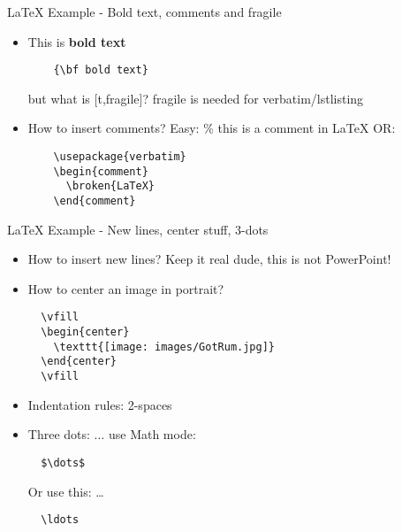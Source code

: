 
\begin{frame}[t,plain]
  \titlepage
\end{frame}

\begin{frame}[t,fragile]{LaTeX Example - Bold text, comments and fragile}
\begin{itemize}
  \item This is {\bf bold text}
  \begin{lstlisting}
    {\bf bold text}
  \end{lstlisting}
but what is [t,fragile]?
fragile is needed for verbatim/lstlisting
  \item How to insert comments?
  Easy: \% this is a comment in LaTeX
  OR:
  \begin{lstlisting}
    \usepackage{verbatim}
    \begin{comment}
      \broken{LaTeX}
    \end{comment}
  \end{lstlisting}
  \end{itemize}
\end{frame}

\begin{frame}[t,fragile]{LaTeX Example - New lines, center stuff, 3-dots}
\begin{itemize}
  \item How to insert new lines?
  Keep it real dude, this is not PowerPoint!
  \item How to center an image in portrait?
  \begin{lstlisting}
  \vfill
  \begin{center}
    \texttt{[image: images/GotRum.jpg]}
  \end{center}
  \vfill
  \end{lstlisting}
  \item Indentation rules: 2-spaces
  \item Three dots: $\dots$
  use Math mode:
  \begin{lstlisting}
  $\dots$
  \end{lstlisting}
  Or use this: \ldots
  \begin{lstlisting}
  \ldots
  \end{lstlisting}
\end{itemize}
\end{frame}


